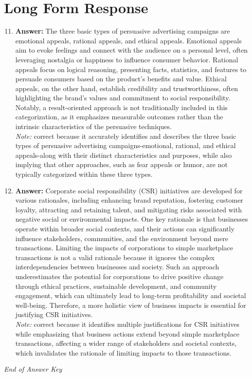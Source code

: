 \documentclass[12pt]{article}
\begin{document}
\section*{Long Form Response}
\begin{enumerate}[label=\arabic*.]
\setcounter{enumi}{10}
\item \textbf{Answer:} The three basic types of persuasive advertising campaigns are emotional appeals, rational appeals, and ethical appeals. Emotional appeals aim to evoke feelings and connect with the audience on a personal level, often leveraging nostalgia or happiness to influence consumer behavior. Rational appeals focus on logical reasoning, presenting facts, statistics, and features to persuade consumers based on the product's benefits and value. Ethical appeals, on the other hand, establish credibility and trustworthiness, often highlighting the brand's values and commitment to social responsibility. Notably, a result-oriented approach is not traditionally included in this categorization, as it emphasizes measurable outcomes rather than the intrinsic characteristics of the persuasive techniques.
\\ \textit{Note:} correct because it accurately identifies and describes the three basic types of persuasive advertising campaigns-emotional, rational, and ethical appeals-along with their distinct characteristics and purposes, while also implying that other approaches, such as fear appeals or humor, are not typically categorized within these three types.
\item \textbf{Answer:} Corporate social responsibility (CSR) initiatives are developed for various rationales, including enhancing brand reputation, fostering customer loyalty, attracting and retaining talent, and mitigating risks associated with negative social or environmental impacts. One key rationale is that businesses operate within broader social contexts, and their actions can significantly influence stakeholders, communities, and the environment beyond mere transactions. Limiting the impacts of corporations to simple marketplace transactions is not a valid rationale because it ignores the complex interdependencies between businesses and society. Such an approach underestimates the potential for corporations to drive positive change through ethical practices, sustainable development, and community engagement, which can ultimately lead to long-term profitability and societal well-being. Therefore, a more holistic view of business impacts is essential for justifying CSR initiatives.
\\ \textit{Note:} correct because it identifies multiple justifications for CSR initiatives while emphasizing that business actions extend beyond simple marketplace transactions, affecting a wider range of stakeholders and societal contexts, which invalidates the rationale of limiting impacts to those transactions.
\end{enumerate}

\vfill
\noindent\textit{End of Answer Key}
\end{document}
